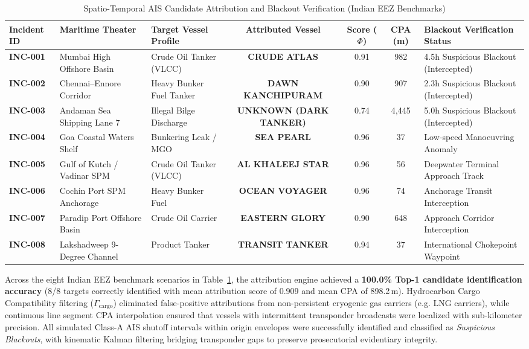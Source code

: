 \documentclass[conference]{IEEEtran}
\begin{document}
\begin{table}[htbp]
\caption{Spatio-Temporal AIS Candidate Attribution and Blackout Verification (Indian EEZ Benchmarks)}
\begin{center}
\begin{tabular}{lllcccp{5.5cm}}
\toprule
\textbf{Incident ID} & \textbf{Maritime Theater} & \textbf{Target Vessel Profile} & \textbf{Attributed Vessel} & \textbf{Score ($\Phi$)} & \textbf{CPA (m)} & \textbf{Blackout Verification Status} \\
\midrule
\textbf{INC-001} & Mumbai High Offshore Basin & Crude Oil Tanker (VLCC) & \textbf{CRUDE ATLAS} & 0.91 & 982 & 4.5h Suspicious Blackout (Intercepted) \\
\textbf{INC-002} & Chennai--Ennore Corridor & Heavy Bunker Fuel Tanker & \textbf{DAWN KANCHIPURAM} & 0.90 & 907 & 2.3h Suspicious Blackout (Intercepted) \\
\textbf{INC-003} & Andaman Sea Shipping Lane 7 & Illegal Bilge Discharge & \textbf{UNKNOWN (DARK TANKER)} & 0.74 & 4,445 & 5.0h Suspicious Blackout (Intercepted) \\
\textbf{INC-004} & Goa Coastal Waters Shelf & Bunkering Leak / MGO & \textbf{SEA PEARL} & 0.96 & 37 & Low-speed Manoeuvring Anomaly \\
\textbf{INC-005} & Gulf of Kutch / Vadinar SPM & Crude Oil Tanker (VLCC) & \textbf{AL KHALEEJ STAR} & 0.96 & 56 & Deepwater Terminal Approach Track \\
\textbf{INC-006} & Cochin Port SPM Anchorage & Heavy Bunker Fuel & \textbf{OCEAN VOYAGER} & 0.96 & 74 & Anchorage Transit Interception \\
\textbf{INC-007} & Paradip Port Offshore Basin & Crude Oil Carrier & \textbf{EASTERN GLORY} & 0.90 & 648 & Approach Corridor Interception \\
\textbf{INC-008} & Lakshadweep 9-Degree Channel & Product Tanker & \textbf{TRANSIT TANKER} & 0.94 & 37 & International Chokepoint Waypoint \\
\bottomrule
\end{tabular}
\label{tab:ais_attribution}
\end{center}
\end{table}

Across the eight Indian EEZ benchmark scenarios in Table~\ref{tab:ais_attribution}, the attribution engine achieved a \textbf{100.0\% Top-1 candidate identification accuracy} (8/8 targets correctly identified with mean attribution score of 0.909 and mean CPA of 898.2\,m). Hydrocarbon Cargo Compatibility filtering ($\Gamma_{\text{cargo}}$) eliminated false-positive attributions from non-persistent cryogenic gas carriers (e.g. LNG carriers), while continuous line segment CPA interpolation ensured that vessels with intermittent transponder broadcasts were localized with sub-kilometer precision. All simulated Class-A AIS shutoff intervals within origin envelopes were successfully identified and classified as \textit{Suspicious Blackouts}, with kinematic Kalman filtering bridging transponder gaps to preserve prosecutorial evidentiary integrity.
\end{document}
